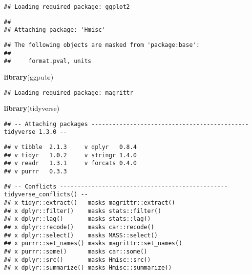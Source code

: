 \documentclass[]{article}
\newenvironment{Shaded}{\begin{snugshade}}{\end{snugshade}}
\newcommand{\KeywordTok}[1]{\textcolor[rgb]{0.13,0.29,0.53}{\textbf{#1}}}
\newcommand{\NormalTok}[1]{#1}
\begin{document}
\begin{verbatim}
## Loading required package: ggplot2
\end{verbatim}

\begin{verbatim}
## 
## Attaching package: 'Hmisc'
\end{verbatim}

\begin{verbatim}
## The following objects are masked from 'package:base':
## 
##     format.pval, units
\end{verbatim}

\begin{Shaded}
\begin{Highlighting}[]
\KeywordTok{library}\NormalTok{(ggpubr)}
\end{Highlighting}
\end{Shaded}

\begin{verbatim}
## Loading required package: magrittr
\end{verbatim}

\begin{Shaded}
\begin{Highlighting}[]
\KeywordTok{library}\NormalTok{(tidyverse)}
\end{Highlighting}
\end{Shaded}

\begin{verbatim}
## -- Attaching packages --------------------------------------------- tidyverse 1.3.0 --
\end{verbatim}

\begin{verbatim}
## v tibble  2.1.3     v dplyr   0.8.4
## v tidyr   1.0.2     v stringr 1.4.0
## v readr   1.3.1     v forcats 0.4.0
## v purrr   0.3.3
\end{verbatim}

\begin{verbatim}
## -- Conflicts ------------------------------------------------ tidyverse_conflicts() --
## x tidyr::extract()   masks magrittr::extract()
## x dplyr::filter()    masks stats::filter()
## x dplyr::lag()       masks stats::lag()
## x dplyr::recode()    masks car::recode()
## x dplyr::select()    masks MASS::select()
## x purrr::set_names() masks magrittr::set_names()
## x purrr::some()      masks car::some()
## x dplyr::src()       masks Hmisc::src()
## x dplyr::summarize() masks Hmisc::summarize()
\end{verbatim}
\end{document}
